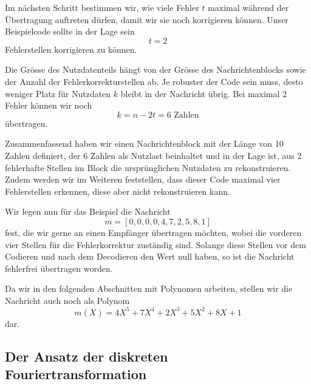 Im nächsten Schritt bestimmen wir, wie viele Fehler $t$ maximal während der Übertragung auftreten dürfen, damit wir sie noch korrigieren können.
Unser Beispielcode sollte in der Lage sein
\[
t = 2
\]
Fehlerstellen korrigieren zu können.

Die Grösse des Nutzdatenteils hängt von der Grösse des Nachrichtenblocks sowie der Anzahl der Fehlerkorrekturstellen ab. Je robuster der Code sein muss, desto weniger Platz für Nutzdaten $k$ bleibt in der Nachricht übrig.
Bei maximal 2 Fehler können wir noch
\[
k = n - 2t = 6\text{ Zahlen}
\]
übertragen. 

Zusammenfassend haben wir einen Nachrichtenblock mit der Länge von 10 Zahlen definiert, der 6 Zahlen als Nutzlast beinhaltet und in der Lage ist, aus 2 fehlerhafte Stellen im Block die ursprünglichen Nutzdaten zu rekonstruieren. Zudem werden wir im Weiteren feststellen, dass dieser Code maximal vier Fehlerstellen erkennen, diese aber nicht rekonstruieren kann.

Wir legen nun für das Beispiel die Nachricht
\[
m = [0,0,0,0,4,7,2,5,8,1]
\]
fest, die wir gerne an einen Empfänger übertragen möchten, wobei die vorderen vier Stellen für die Fehlerkorrektur zuständig sind.
Solange diese Stellen vor dem Codieren und nach dem Decodieren den Wert null haben, so ist die Nachricht fehlerfrei übertragen worden.

Da wir in den folgenden Abschnitten mit Polynomen arbeiten, stellen wir die Nachricht auch noch als Polynom
\[
m(X) = 4X^5 + 7X^4 + 2X^3 + 5X^2 + 8X + 1
\] 
dar.


\subsection{Der Ansatz der diskreten Fouriertransformation
	\label{reedsolomon:subsection:diskFT}}

